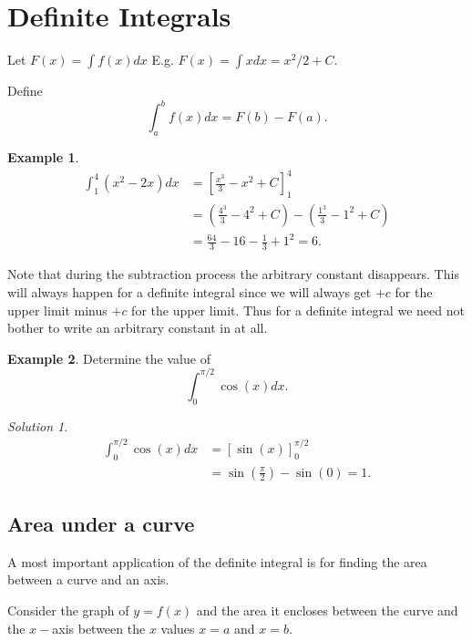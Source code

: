 \documentclass[
  11pt,
  oneside]{book}
\newcommand{\slide}{}
\theoremstyle{definition}
\theoremstyle{definition}
\newtheorem{example}{Example}[chapter]
\theoremstyle{definition}
\theoremstyle{definition}
\theoremstyle{remark}
\newtheorem*{solution}{Solution}
\begin{document}
\slide

\section{Definite Integrals}\label{definite-integrals}

Let \(F(x) = \displaystyle\int f(x)dx\) E.g. \(F(x)=\displaystyle\int xdx = x^2/2 + C\).

Define
\[
\int_a^b f(x)dx = F(b)-F(a).
\]

\begin{example}
\begin{align*}
\int_1^4(x^2-2x)dx& = \left[\frac{x^3}{3}-x^2+C\right]_1^4\\
&=\left(\frac{4^3}{3}-4^2+C\right) - \left(\frac{1^3}{3}-1^2+C\right)\\
&=\frac{64}{3}-16-\frac{1}{3}+1^2 = 6.
\end{align*}
\end{example}

Note that during the subtraction process the arbitrary constant disappears. This will always happen for a definite integral since we will always get \(+ c\) for the upper limit minus \(+ c\) for the upper limit. Thus for a definite integral we need not bother to write an arbitrary constant in at all.
\slide

\begin{example}
Determine the value of
\[
\int_0^{\pi/2}\cos(x)dx.
\]
\end{example}

\begin{solution}
\begin{align*}
\int_0^{\pi/2}\cos(x)dx& = \left[\sin(x)\right]_0^{\pi/2}\\
&=\sin\left(\frac{\pi}{2}\right)-\sin(0) = 1.
\end{align*}
\end{solution}

\slide

\subsection{Area under a curve}\label{area-under-a-curve}

A most important application of the definite integral is for finding the area between a curve and an axis.

Consider the graph of \(y = f(x)\) and the area it encloses between the curve and the \(x-\)axis between the \(x\) values \(x = a\) and \(x = b\).
\end{document}
